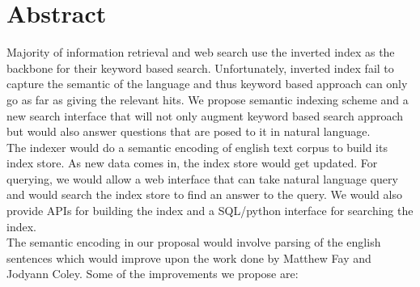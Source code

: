 \documentclass[10pt]{article}
\begin{document}
 


\section{Abstract}
Majority of information retrieval and web search use the inverted index as the backbone for their keyword based search. Unfortunately, inverted index fail to capture the semantic of the language and thus keyword based approach can only go as far as giving the relevant hits. We propose semantic indexing scheme and a new search interface that will not only augment keyword based search approach but would also answer questions that are posed to it in natural language.
\\
The indexer would do a semantic encoding of english text corpus to build its index store. As new data comes in, the index store would get updated. For querying, we would allow a web interface that can take natural language query and would search the index store to find an answer to the query. We would also provide APIs for building the index and a SQL/python interface for searching the index. 
 \\
The semantic encoding in our proposal would involve parsing of the english sentences which would improve upon the work done by Matthew Fay and Jodyann Coley. Some of the improvements we propose are:
\end{document}
